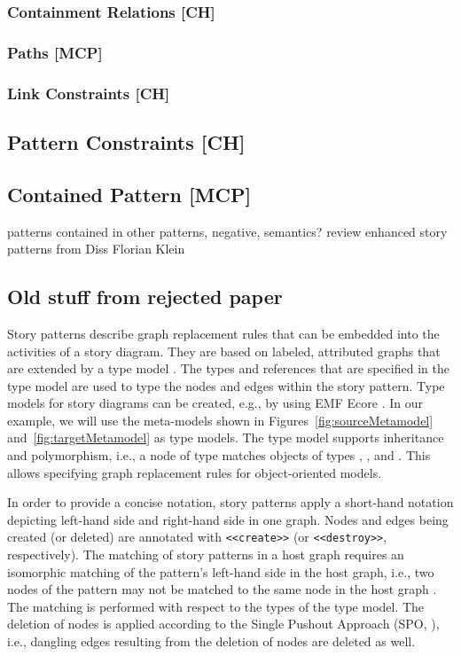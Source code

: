 \subsubsection{Containment Relations [CH]}

\subsubsection{Paths [MCP]}

\subsubsection{Link Constraints [CH]}

\subsection{Pattern Constraints [CH]}

\subsection{Contained Pattern [MCP]}

patterns contained in other patterns, negative, semantics? review enhanced story patterns from Diss Florian Klein

\subsection*{Old stuff from rejected paper}

Story patterns describe graph replacement rules that can be embedded into the activities of a story diagram. They are based on labeled, attributed graphs that are extended by a type model \cite{FNTZ00}. 
The types and references that are specified in the type model are used to type the nodes and edges within the story pattern.
Type models for story diagrams can be created, e.g., by using EMF Ecore \cite{SBP+08}.
In our example, we will use the meta-models shown in Figures~\ref{fig:sourceMetamodel} and~\ref{fig:targetMetamodel} as type models. The type model supports inheritance and polymorphism, i.e., a node of type  matches objects of types , , and .
This allows specifying graph replacement rules for object-oriented models.

In order to provide a concise notation, story patterns apply a short-hand notation depicting left-hand side and right-hand side in one graph. Nodes and edges being created (or deleted) are annotated with \small \verb|<<create>>| \normalsize (or  {\small \verb|<<destroy>>|\normalsize}, respectively). The matching of story patterns in a host graph requires an isomorphic matching of the pattern's left-hand side in the host graph, i.e., two nodes of the pattern may not be matched to the same node in the host graph \cite{FNTZ00,Roz97}. The matching is performed with respect to the types of the type model. The deletion of nodes is applied according to the Single Pushout Approach (SPO, \cite{Roz97}), i.e., dangling edges resulting from the deletion of nodes are deleted as well.

